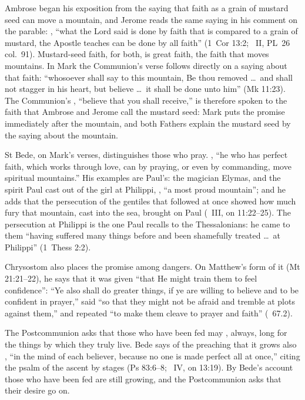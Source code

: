 Ambrose began his exposition from the saying that faith as a grain of mustard
seed can move a mountain, and Jerome reads the same saying in his comment on
the parable: , ``what the Lord said is
done by faith that is compared to a grain of mustard, the Apostle teaches can
be done by all faith'' (1~Cor 13:2; ~II, PL~26 col.~91).
Mustard-seed faith, for both, is great faith, the faith that moves mountains.
In Mark the Communion's verse follows directly on a saying about that faith:
``whosoever shall say to this mountain, Be thou removed \dots\ and shall not
stagger in his heart, but believe \dots\ it shall be done unto him'' (Mk
11:23). The Communion's , ``believe that you
shall receive,'' is therefore spoken to the faith that Ambrose and Jerome call
the mustard seed: Mark puts the promise immediately after the mountain, and
both Fathers explain the mustard seed by the saying about the mountain.

St Bede, on Mark's verses, distinguishes those who pray. , ``he who has perfect faith, which works
through love, can by praying, or even by commanding, move spiritual
mountains.'' His examples are Paul's: the magician Elymas, and the spirit
Paul cast out of the girl at Philippi, , ``a most proud mountain''; and he adds that the persecution of
the gentiles that followed at once showed how much fury that mountain, cast
into the sea, brought on Paul (~III, on 11:22--25). The
persecution at Philippi is the one Paul recalls to the Thessalonians: he came
to them ``having suffered many things before and been shamefully treated
\dots\ at Philippi'' (1~Thess 2:2).

Chrysostom also places the promise among dangers. On Matthew's form of it
(Mt 21:21--22), he says that it was given ``that He might train them to feel confidence'': ``Ye also shall do
greater things, if ye are willing to believe and to be confident in prayer,''
said ``so that they might not be afraid and tremble at plots against them,''
and repeated ``to make them cleave to prayer and faith'' (~67.2).

The Postcommunion asks that those who have been fed may , always,
long for the things by which they truly live. Bede says of the preaching that
it grows also , ``in the mind of each believer, because no one is made perfect all
at once,'' citing the psalm of the ascent by stages (Ps 83:6--8; ~IV, on 13:19). By Bede's account those who have been fed are still
growing, and the Postcommunion asks that their desire go on.

